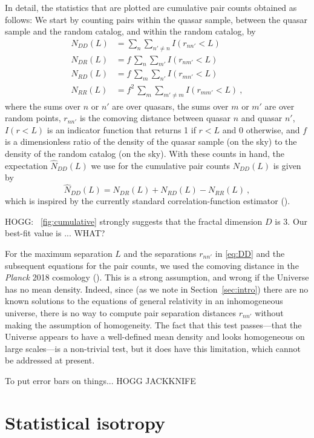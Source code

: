 \documentclass[modern]{aastex631}
\newcommand{\sectionname}{Section}
\newcommand{\secref}[1]{\sectionname~\ref{#1}}
\newcommand{\figref}[1]{\figurename~\ref{#1}}
\begin{document}
In detail, the statistics that are plotted are cumulative pair counts obtained as follows:
We start by counting pairs within the quasar sample, between the quasar sample and the random catalog, and within the random catalog, by
\begin{align}\label{eq:DD}
    N_{DD}(L) &= \sum_n \sum_{n'\ne n} I(r_{nn'} < L) \\
    N_{DR}(L) &= f\,\sum_n \sum_{m'} I(r_{nm'} < L) \\
    N_{RD}(L) &= f\,\sum_m \sum_{n'} I(r_{mn'} < L) \\
    N_{RR}(L) &= f^2\,\sum_m \sum_{m'\ne m} I(r_{mm'} < L) ~,
\end{align}
where the sums over $n$ or $n'$ are over quasars,
the sums over $m$ or $m'$ are over random points,
$r_{nn'}$ is the comoving distance between quasar $n$ and quasar $n'$,
$I(r<L)$ is an indicator function that returns 1 if $r<L$ and 0 otherwise,
and $f$ is a dimensionless ratio of the density of the quasar sample (on the sky) to the density of the random catalog (on the sky).
With these counts in hand, the expectation $\hat{N}_{DD}(L)$ we use for the cumulative pair counts $N_{DD}(L)$ is given by
\begin{equation}
    \hat{N}_{DD}(L) = N_{DR}(L) + N_{RD}(L) - N_{RR}(L) ~,
\end{equation}
which is inspired by the currently standard correlation-function estimator (\citealt{ls}).

HOGG: \figref{fig:cumulative} strongly suggests that the fractal dimension $D$ is 3.
Our best-fit value is ... WHAT?

For the maximum separation $L$ and the separations $r_{nn'}$ in \eqref{eq:DD} and the subsequent equations for the pair counts, we used the comoving distance in the \textsl{Planck} 2018 cosmology (\citealt{planck}).
This is a strong assumption, and wrong if the Universe has no mean density.
Indeed, since (as we note in \secref{sec:intro}) there are no known solutions to the equations of general relativity in an inhomogeneous universe, there is no way to compute pair separation distances $r_{nn'}$ without making the assumption of homogeneity.
The fact that this test passes---that the Universe appears to have a well-defined mean density and looks homogeneous on large scales---is a non-trivial test, but it does have this limitation, which cannot be addressed at present.

To put error bars on things... HOGG JACKKNIFE

\section{Statistical isotropy}\label{sec:stat}
\end{document}
